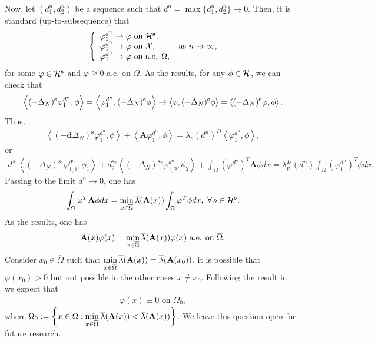 \documentclass[a4paper,11pt]{amsart}
\theoremstyle{definition}
\def\O{\Omega}
\numberwithin{equation}{section}
\theoremstyle{definition}
\def\O{\Omega}
\begin{document}
Now, let $(d^n_1,d^n_2)$ be a sequence such that $d^n=\max\{d^n_1,d^n_2\}\rightarrow 0$. Then, it is standard  (up-to-subsequence) that
\begin{align*}
\left\{\begin{array}{llll}
\varphi^{d^n}_1	\rightharpoonup \varphi \text{ on }\mathcal{H}^{\bf s},\\
\varphi^{d^n}_1	\rightarrow \varphi \text{ on }\mathcal{X},\\
\varphi^{d^n}_1	\rightarrow \varphi \text{ on a.e. }\overline{\O},
\end{array}
\right.\text{ as }n\rightarrow \infty,
\end{align*}
for some $\varphi\in \mathcal{H}^{\bf s}$ and $\varphi \geq 0$ a.e. on $\overline{\O}$. As the results, for any $\phi\in \mathcal{H}^{\bf}$, we can check that
\begin{align*}
\left<(-\Delta_N)^{\bf s}\varphi^{d^n}_1,\phi\right>=\left<\varphi^{d^n}_1,(-\Delta_N)^{\bf s}\phi\right>\rightarrow \left<\varphi,(-\Delta_N)^{\bf s}\phi\right>=\left<(-\Delta_N)^{\bf s}\varphi,\phi\right>.
\end{align*}
Thus,
\begin{align*}
\left<(-\textbf{d}\Delta_N)^{\textbf{s}}\varphi^{d^n}_1,\phi\right> + \left<\textbf{A}\varphi^{d^n}_1,\phi\right> =\lambda_p(d^n)^D\left<\varphi^{d^n}_1,\phi\right>,
\end{align*}
or
\begin{align*}
d_1^{s_1}\left<(-\Delta_N)^{s_1}\varphi^{d^n}_{1,1},\phi_1\right>+d_2^{s_2}\left<(-\Delta_N)^{s_2}\varphi^{d^n}_{1,2},\phi_2\right>+\int_{\O}(\varphi_1^{d^n})^T\textbf{A}\phi dx=\lambda_p^D(d^n)\int_{\O}(\varphi_1^{d^n})^T\phi dx.
\end{align*}
Passing to the limit $d^n\rightarrow 0$, one has
\begin{align*}
\int_{\O}\varphi^T\textbf{A}\phi dx=\min\limits_{x\in \overline{\O}}\overline{\lambda}({\bf A}(x))\int_{\O}\varphi^T\phi dx,~\forall \phi \in \mathcal{H}^{\bf s}.
\end{align*}
As the results, one has
\begin{align*}
\textbf{A}(x)\varphi(x)=\min\limits_{x\in \overline{\O}}\overline{\lambda}({\bf A}(x))\varphi(x)\text{ a.e. on }\overline{\O}.
\end{align*}
Consider $x_0 \in \overline{\O}$ such that $\min\limits_{x\in \overline{\O}}\overline{\lambda}({\bf A}(x))=\overline{\lambda}({\bf A}(x_0))$, it is possible that $\varphi(x_0)>0$ but not possible in the other cases $x\neq x_0$. Following the result in \cite[Proposition 1.3.17]{lam_Introduction_2022}, we expect that 
\begin{align*}
\varphi(x)\equiv 0 \text{ on }\O_0,
\end{align*}
where $\O_0:=\left\{x\in \O:\min\limits_{x\in \overline{\O}}\overline{\lambda}({\bf A}(x))<\overline{\lambda}({\bf A}(x))\right\}$. We leave this question open for future research.
\end{document}
